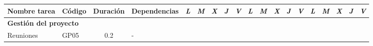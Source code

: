 \begin{table}[H]
\begin{tabular}{|llcllllllllllllllll|}
        \multicolumn{1}{|c|}{\multirow{-2}{*}{\textbf{Nombre tarea}}}                                                           & \multicolumn{1}{c|}{\multirow{-2}{*}{\textbf{Código}}} & \multicolumn{1}{c|}{\multirow{-2}{*}{\textbf{Duración}}} & \multicolumn{1}{c|}{\multirow{-2}{*}{\textbf{Dependencias}}}                 & \multicolumn{1}{l|}{\textit{L}} & \multicolumn{1}{l|}{\textit{M}} & \multicolumn{1}{l|}{\textit{X}} & \multicolumn{1}{l|}{\textit{J}} & \multicolumn{1}{l|}{\textit{V}} & \multicolumn{1}{l|}{\textit{L}} & \multicolumn{1}{l|}{\textit{M}} & \multicolumn{1}{l|}{\textit{X}} & \multicolumn{1}{l|}{\textit{J}} & \multicolumn{1}{l|}{\textit{V}} & \multicolumn{1}{l|}{\textit{L}} & \multicolumn{1}{l|}{\textit{M}} & \multicolumn{1}{l|}{\textit{X}} & \multicolumn{1}{l|}{\textit{J}} & \textit{V}               \\ \hline
        \multicolumn{4}{|l|}{\textbf{Gestión del proyecto}}                                                                                                                                                                                                                                                                        & \multicolumn{15}{l|}{}                                                                                                                                                                                                                                                                                                                                                                                                                                                                                               \\ \hline
        \multicolumn{1}{|l|}{Reuniones}                                                                                         & \multicolumn{1}{l|}{GP05}                              & \multicolumn{1}{c|}{0.2}                                 & \multicolumn{1}{l|}{-}                                                       &                                 &                                 &                                 &                                 &                                 &                                 &                                 &                                 & \cellcolor[HTML]{EF8787}        &                                 &                                 &                                 &                                 &                                 &                          \\ \cline{1-4}

\end{tabular}
\end{table}
